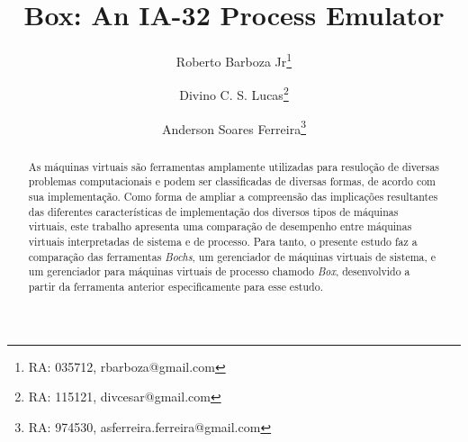 \documentclass[11pt,twoside]{article}
\begin{document}
% 

%



\TRMakeCover


%
\pagestyle{myheadings}

%
\title{Box: An IA-32 Process Emulator}

\author{Roberto Barboza Jr\thanks{RA: 035712, rbarboza@gmail.com} \and
Divino C. S. Lucas\thanks{RA: 115121, divcesar@gmail.com} \and
Anderson Soares Ferreira\thanks{RA: 974530, asferreira.ferreira@gmail.com}}

\date{}

\maketitle


\begin{abstract} 
 As máquinas virtuais são ferramentas amplamente utilizadas para resuloção de diversas problemas computacionais e podem ser classificadas de diversas formas, de acordo com sua implementação.
 Como forma de ampliar a compreensão das implicações resultantes das diferentes características de implementação dos diversos tipos de máquinas virtuais, este trabalho apresenta uma comparação de desempenho entre máquinas virtuais interpretadas de sistema e de processo.
 Para tanto, o presente estudo faz a comparação das ferramentas \emph{Bochs}, um gerenciador de máquinas virtuais de sistema, e um gerenciador para máquinas virtuais de processo chamodo \emph{Box}, desenvolvido a partir da ferramenta anterior especificamente para esse estudo.
\end{abstract}
\end{document}
